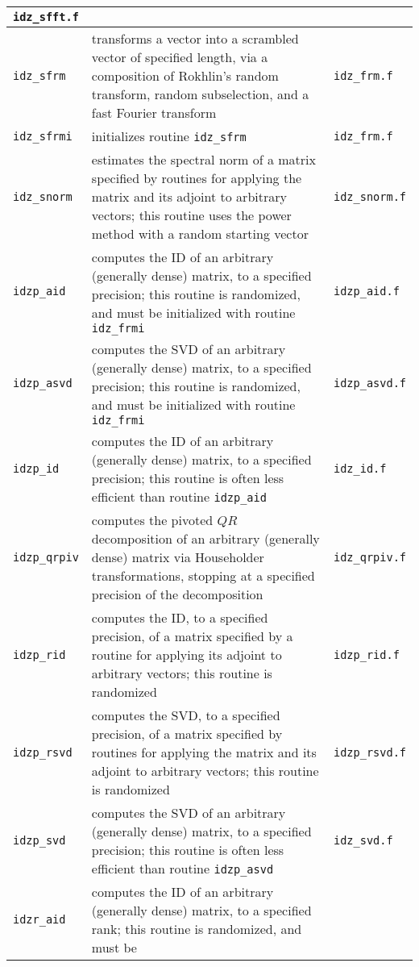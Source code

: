 \documentclass[letterpaper,12pt]{article}
\begin{document}
\begin{center}
\begin{supertabular}{>{\raggedright}p{1.2in} p{.53\textwidth} l}
{\tt idz\_sfft.f} \\\hline
%
{\tt idz\_sfrm} & transforms a vector into a scrambled vector of
specified length, via a composition of Rokhlin's random transform,
random subselection, and a fast Fourier transform & {\tt idz\_frm.f}
\\\hline
%
{\tt idz\_sfrmi} & initializes routine {\tt idz\_sfrm} &
{\tt idz\_frm.f} \\\hline
%
{\tt idz\_snorm} & estimates the spectral norm of a matrix specified by
routines for applying the matrix and its adjoint to arbitrary
vectors; this routine uses the power method with a random starting
vector & {\tt idz\_snorm.f} \\\hline
%
{\tt idzp\_aid} & computes the ID of an arbitrary (generally dense)
matrix, to a specified precision; this routine is randomized, and must
be initialized with routine {\tt idz\_frmi} & {\tt idzp\_aid.f}
\\\hline
%
{\tt idzp\_asvd} & computes the SVD of an arbitrary (generally dense)
matrix, to a specified precision; this routine is randomized, and must
be initialized with routine {\tt idz\_frmi} & {\tt idzp\_asvd.f}
\\\hline
%
{\tt idzp\_id} & computes the ID of an arbitrary (generally dense)
matrix, to a specified precision; this routine is often less efficient
than routine {\tt idzp\_aid} & {\tt idz\_id.f} \\\hline
%
{\tt idzp\_qrpiv} & computes the pivoted $QR$ decomposition of an
arbitrary (generally dense) matrix via Householder transformations,
stopping at a specified precision of the decomposition &
{\tt idz\_qrpiv.f} \\\hline
%
{\tt idzp\_rid} & computes the ID, to a specified precision, of a
matrix specified by a routine for applying its adjoint to arbitrary
vectors; this routine is randomized & {\tt idzp\_rid.f} \\\hline
%
{\tt idzp\_rsvd} & computes the SVD, to a specified precision, of a
matrix specified by routines for applying the matrix and its adjoint
to arbitrary vectors; this routine is randomized & {\tt idzp\_rsvd.f}
\\\hline
%
{\tt idzp\_svd} & computes the SVD of an arbitrary (generally dense)
matrix, to a specified precision; this routine is often less efficient
than routine {\tt idzp\_asvd} & {\tt idz\_svd.f} \\\hline
%
{\tt idzr\_aid} & computes the ID of an arbitrary (generally dense)
matrix, to a specified rank; this routine is randomized, and must be

\end{supertabular}
\end{center}
\end{document}
